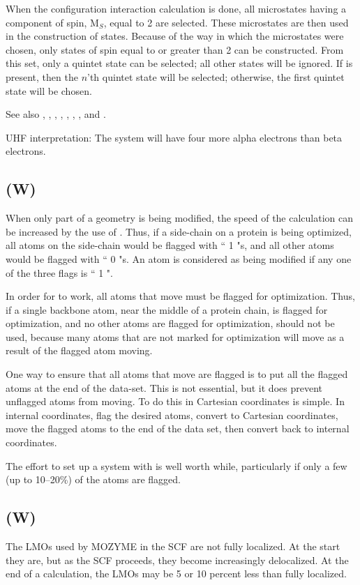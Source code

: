  When the configuration interaction calculation is done, all microstates having
a component of spin,  M$_S$, equal to 2 are selected.  These microstates are then
used in the construction of states.  Because of the way in which the microstates
were chosen, only states of spin equal to or greater than 2 can be constructed.
From this set, only a quintet state can be selected; all other
states will be ignored.
If  is present, then the $n$'th quintet state will be selected;
otherwise, the first quintet state will be  chosen.

See also , , , ,
, , ,  and .


        UHF interpretation:  The system will have four  more alpha electrons
   than beta electrons.
\subsection*{ (W)}
When only part of a geometry is being modified, the speed of the calculation can
be increased by the use of .  Thus, if a side-chain on a protein
is being optimized, all atoms on the side-chain would be flagged with `` 1 "s,
and all other atoms would be flagged with `` 0 "s.  An atom is considered as
being modified if any one of the three flags is `` 1 ".

 In order for  to work,
all atoms that move must be flagged for optimization.  Thus, if a single backbone
atom, near the middle of a protein chain, is flagged for optimization, and no other
atoms are flagged for optimization,  should not be used, because
many atoms that are not marked for optimization will move as a result of the
flagged atom moving.

One way to ensure that all atoms that move are flagged is to put all the
flagged atoms at the end of the data-set.  This is not essential, but it does
prevent unflagged atoms from moving.  To do this in Cartesian coordinates
is simple.  In internal coordinates, flag the desired atoms, convert
to Cartesian coordinates, move the flagged atoms to the end of the data set,
then convert back to internal coordinates.

The effort to set up a system with  is well worth while, particularly
if only a few (up to 10--20\%) of the atoms are flagged.

\subsection*{ (W)}
The LMOs used by MOZYME in the SCF are not fully localized.  At the start they are,
but as the SCF proceeds, they become increasingly delocalized.  At the end of
a calculation, the LMOs may be 5 or 10 percent less than fully localized.

